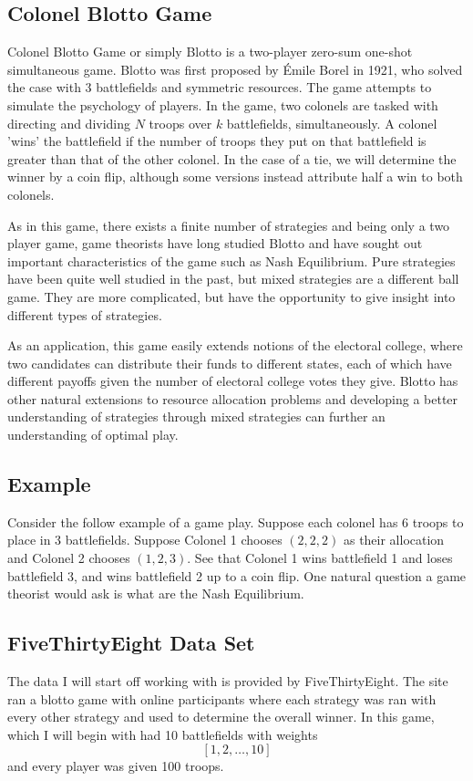 \documentclass[11pt,letter]{article}
\begin{document}
\subsection{Colonel Blotto Game}
Colonel Blotto Game or simply Blotto is a two-player zero-sum one-shot simultaneous game. Blotto was first proposed by \'{E}mile Borel in 1921, who solved the case with 3 battlefields and symmetric resources. The game attempts to simulate the psychology of players. In the game, two colonels are tasked with directing and dividing $N$ troops over $k$ battlefields, simultaneously. A colonel 'wins' the battlefield if the number of troops they put on that battlefield is greater than that of the other colonel. In the case of a tie, we will determine the winner by a coin flip, although some versions instead attribute half a win to both colonels. 

As in this game, there exists a finite number of strategies and being only a two player game, game theorists have long studied Blotto and have sought out important characteristics of the game such as Nash Equilibrium. Pure strategies have been quite well studied in the past, but mixed strategies are a different ball game. They are more complicated, but have the opportunity to give insight into different types of strategies.

As an application, this game easily extends notions of the electoral college, where two candidates can distribute their funds to different states, each of which have different payoffs given the number of electoral college votes they give. Blotto has other natural extensions to resource allocation problems and developing a better understanding of strategies through mixed strategies can further an understanding of optimal play.

\subsection{Example}
Consider the follow example of a game play. Suppose each colonel has 6 troops to place in 3 battlefields. Suppose Colonel 1 chooses $(2, 2, 2)$ as their allocation and Colonel 2 chooses $(1, 2, 3)$. See that Colonel 1 wins battlefield 1 and loses battlefield 3, and wins battlefield 2 up to a coin flip. One natural question a game theorist would ask is what are the Nash Equilibrium.

\subsection{FiveThirtyEight Data Set}
The data I will start off working with is provided by FiveThirtyEight. The site ran a blotto game with online participants where each strategy was ran with every other strategy and used to determine the overall winner. In this game, which I will begin with had 10 battlefields with weights 
\[[1, 2, \dots, 10]\]
and every player was given 100 troops.
\end{document}
